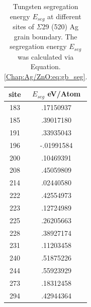 \begin{table}[!ht]
\caption[Tungsten segregation energy $E_{seg}$ at different sites of Ag $\Sigma$29 (520) grain boundary.]{Tungsten segregation energy $E_{seg}$ at different sites of $\Sigma$29 (520) Ag grain boundary. The segregation energy $E_{seg}$ was calculated via Equation. \ref{Chap:Ag/ZnO:eq:gb_seg}.}
\label{Chap:Ag/ZnO:tab3}
\centering
\begin{tabular}{cc}
\hline
\hline
site & $E_{seg}$ eV/Atom \\ 
\hline
183  & .17150937         \\
185  & .39017180         \\
191  & .33935043         \\
196  & -.01991584        \\
200  & .10469391         \\
208  & .45059809         \\
214  & .02440580         \\
222  & .42554973         \\
223  & .12724989         \\
225  & .26205663         \\
228  & .38927174         \\
231  & .11203458         \\
240  & .51875226         \\
244  & .55923929         \\
273  & .18312458         \\
294  & .42944364         \\ 
\hline
\hline
\end{tabular}
\end{table}
